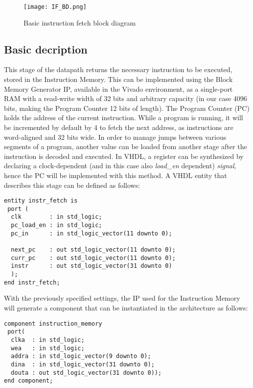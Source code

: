 \begin{figure}[ht!]
  \centering
  \texttt{[image: IF\_BD.png]}
  \caption{Basic instruction fetch block diagram}
  \label{fig:IF_BD}
\end{figure}
\subsection{Basic decription}
This stage of the datapath returns the necessary instruction to be executed, stored in the Instruction Memory. This can be implemented using the Block Memory Generator IP, available in the Vivado environment, as a single-port RAM with a read-write width of 32 bits and arbitrary capacity (in our case 4096 bits, making the Program Counter 12 bits of length).
The Program Counter (PC) holds the address of the current instruction. While a program is running, it will be incremented by default by 4 to fetch the next address, as instructions are word-aligned and 32 bits wide. In order to manage jumps between various segments of a program, another value can be loaded from another stage after the instruction is decoded and executed.
In VHDL, a register can be synthesized by declaring a clock-dependent (and in this case also \emph{load{\_}en} dependent) \emph{signal}, hence the PC will be implemented with this method.
A VHDL entity that describes this stage can be defined as follows:\\
\begin{verbatim}
entity instr_fetch is
 port ( 
  clk        : in std_logic;
  pc_load_en : in std_logic;
  pc_in      : in std_logic_vector(11 downto 0);
       
  next_pc    : out std_logic_vector(11 downto 0);
  curr_pc    : out std_logic_vector(11 downto 0);
  instr      : out std_logic_vector(31 downto 0)
  );
end instr_fetch;
\end{verbatim}
\vspace{1\baselineskip}
With the previously specified settings, the IP used for the Instruction Memory will generate a component that can be instantiated in the architecture as follows:\\
\begin{verbatim}
component instruction_memory
 port(
  clka  : in std_logic;
  wea   : in std_logic;
  addra : in std_logic_vector(9 downto 0);
  dina  : in std_logic_vector(31 downto 0);
  douta : out std_logic_vector(31 downto 0));
end component;
\end{verbatim}
\vspace{1\baselineskip}

